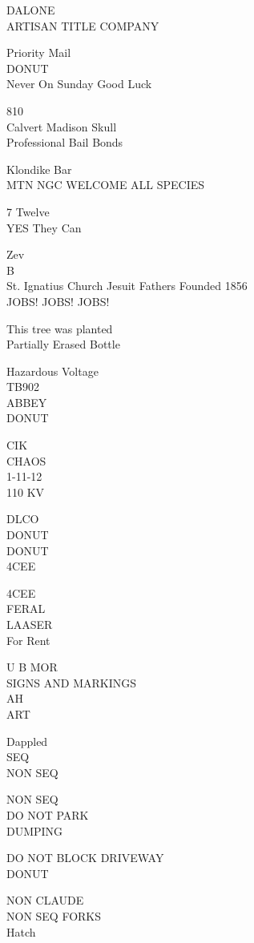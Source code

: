 \documentclass[10pt,letterpaper]{article}
\begin{document}
DALONE\\
ARTISAN TITLE COMPANY

Priority Mail\\
DONUT\\
Never On Sunday Good Luck

810\\
Calvert Madison Skull\\
Professional Bail Bonds

Klondike Bar\\
MTN NGC WELCOME ALL SPECIES

7 Twelve\\
YES They Can

Zev\\
B\\
St. Ignatius Church Jesuit Fathers Founded 1856\\
JOBS! JOBS! JOBS!

This tree was planted\\
Partially Erased Bottle

Hazardous Voltage\\
TB902\\
ABBEY\\
DONUT

CIK\\
CHAOS\\
1{-}11{-}12\\
110 KV

DLCO\\
DONUT\\
DONUT\\
4CEE

4CEE\\
FERAL\\
LAASER\\
For Rent

U B MOR\\
SIGNS AND MARKINGS\\
AH\\
ART

Dappled\\
SEQ\\
NON SEQ

NON SEQ\\
DO NOT PARK\\
DUMPING

DO NOT BLOCK DRIVEWAY\\
DONUT

NON CLAUDE\\
NON SEQ FORKS\\
Hatch
\end{document}
